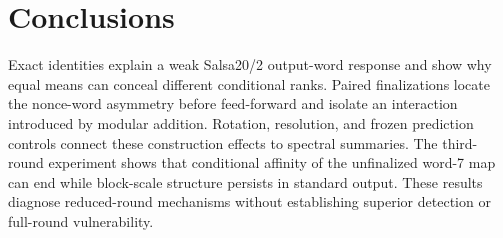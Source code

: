 \documentclass[electronics,article,submit,pdftex,oneauthor]{Definitions/mdpi}
\begin{document}
\section{Conclusions}

Exact identities explain a weak Salsa20/2 output-word response and show why equal means can conceal different conditional ranks. Paired finalizations locate the nonce-word asymmetry before feed-forward and isolate an interaction introduced by modular addition. Rotation, resolution, and frozen prediction controls connect these construction effects to spectral summaries. The third-round experiment shows that conditional affinity of the unfinalized word-7 map can end while block-scale structure persists in standard output. These results diagnose reduced-round mechanisms without establishing superior detection or full-round vulnerability.
\end{document}
